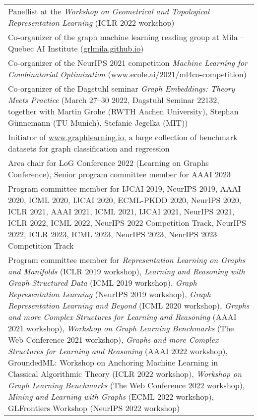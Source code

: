 \documentclass[10pt, a4paper, DIV=14, headings=small]{scrartcl}
\begin{document}
\begin{longtabu}{p{14.5cm}}
	Panellist at the \emph{Workshop on Geometrical and Topological Representation Learning} (ICLR 2022 workshop) \\[2em]

	Co-organizer of the graph machine learning reading group at Mila -- Quebec AI Institute (\url{grlmila.github.io}) \\[3.em]

	Co-organizer of the NeurIPS 2021 competition \emph{Machine Learning for Combinatorial Optimization} (\url{www.ecole.ai/2021/ml4co-competition}) \\[3.em]

	Co-organizer of the Dagstuhl seminar \emph{Graph Embeddings: Theory Meets Practice} (March 27–30 2022, Dagstuhl Seminar 22132, together with Martin Grohe (RWTH Aachen University), Stephan Günnemann (TU Munich), Stefanie Jegelka (MIT)) \\[4.em]

	Initiator of \url{www.graphlearning.io}, a large collection of benchmark datasets for graph classification and regression \\[3em]

	Area chair for LoG Conference 2022 (Learning on Graphs Conference), Senior program committee member for AAAI 2023 \\[3em]

	Program committee member for IJCAI 2019, NeurIPS  2019, AAAI 2020, ICML 2020, IJCAI 2020, ECML-PKDD 2020, NeurIPS 2020, ICLR 2021, AAAI 2021, ICML 2021, IJCAI 2021, NeurIPS 2021, ICLR 2022, ICML 2022, NeurIPS 2022 Competition Track, NeurIPS 2022, ICLR 2023, ICML 2023, NeurIPS 2023, NeurIPS 2023 Competition Track \\[5.em]


	Program committee member for \emph{Representation Learning on Graphs and Manifolds} (ICLR 2019 workshop), \emph{Learning and Reasoning with Graph-Structured Data} (ICML 2019 workshop), \emph{Graph Representation Learning} (NeurIPS 2019 workshop), \emph{Graph Representation Learning and Beyond} (ICML 2020 workshop), \emph{Graphs and more Complex Structures for Learning and Reasoning} (AAAI 2021 workshop), \emph{Workshop on Graph Learning Benchmarks} (The Web Conference 2021 workshop),  \emph{Graphs and more Complex Structures for Learning and Reasoning} (AAAI 2022 workshop), GroundedML: Workshop on Anchoring Machine Learning in Classical Algorithmic Theory (ICLR 2022 workshop), \emph{Workshop on Graph Learning Benchmarks} (The Web Conference 2022 workshop), \emph{Mining and Learning with Graphs} (ECML 2022 workshop), GLFrontiers Workshop (NeurIPS 2022 workshop) \\[34em]



\end{longtabu}
\end{document}
